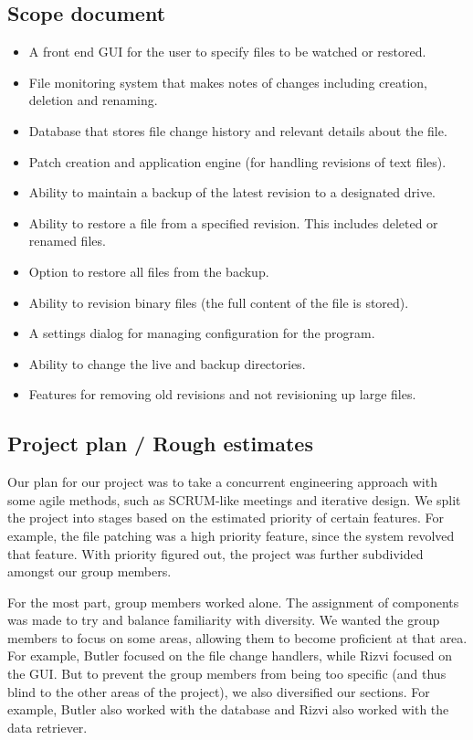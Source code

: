\documentclass[12pt,a4paper]{article}
\begin{document}
\subsection{Scope document}
\begin{itemize}
\item A front end GUI for the user to specify files to be watched or restored.
\item File monitoring system that makes notes of changes including creation, deletion and renaming.
\item Database that stores file change history and relevant details about the file.
\item Patch creation and application engine (for handling revisions of text files).
\item Ability to maintain a backup of the latest revision to a designated drive.
\item Ability to restore a file from a specified revision. This includes deleted or renamed files.
\item Option to restore all files from the backup.
\item Ability to revision binary files (the full content of the file is stored).
\item A settings dialog for managing configuration for the program.
\item Ability to change the live and backup directories.
\item Features for removing old revisions and not revisioning up large files.
\end{itemize}

\subsection{Project plan / Rough estimates}
Our plan for our project was to take a concurrent engineering approach with some agile methods, such as SCRUM-like meetings and iterative design. We split the project into stages based on the estimated priority of certain features. For example, the file patching was a high priority feature, since the system revolved that feature. With priority figured out, the project was further subdivided amongst our group members.

For the most part, group members worked alone. The assignment of components was made to try and balance familiarity with diversity. We wanted the group members to focus on some areas, allowing them to become proficient at that area. For example, Butler focused on the file change handlers, while Rizvi focused on the GUI. But to prevent the group members from being too specific (and thus blind to the other areas of the project), we also diversified our sections. For example, Butler also worked with the database and Rizvi also worked with the data retriever.
\end{document}
